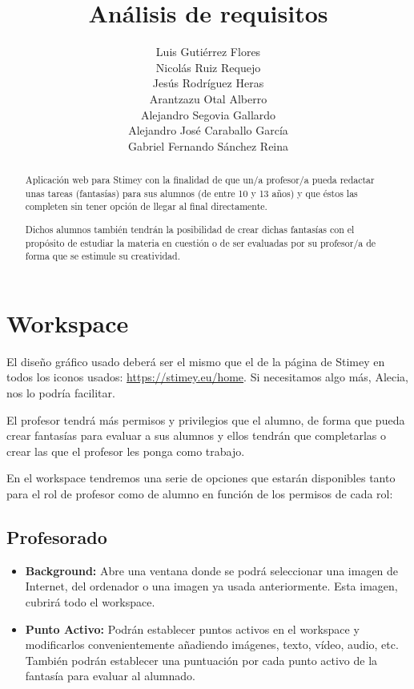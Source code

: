 \documentclass[12pt,letterpaper]{article}
\title{Análisis de requisitos}
\author{Luis Gutiérrez Flores\\
	Nicolás Ruiz Requejo\\
	Jesús Rodríguez Heras\\
	Arantzazu Otal Alberro\\
	Alejandro Segovia Gallardo\\
	Alejandro José Caraballo García\\
	Gabriel Fernando Sánchez Reina}
\begin{document}
	
	\maketitle
	\begin{abstract} %
			Aplicación web para Stimey con la finalidad de que un/a profesor/a pueda redactar unas tareas (fantasías) para sus alumnos (de entre 10 y 13 años) y que éstos las completen sin tener opción de llegar al final directamente.
			
			Dichos alumnos también tendrán la posibilidad de crear dichas fantasías con el propósito de estudiar la materia en cuestión o de ser evaluadas por su profesor/a de forma que se estimule su creatividad.
	\end{abstract}
	\thispagestyle{empty}
	\newpage
	
	
	
	
	
	\lstset{language=bash, numbers=left, numberstyle=\tiny, numbersep=10pt, firstnumber=1, stepnumber=1, basicstyle=\small\ttfamily, tabsize=1, extendedchars=true, inputencoding=utf8/latin1, breaklines=true}

\section{Workspace}
El diseño gráfico usado deberá ser el mismo que el de la página de Stimey en todos los iconos usados: \url{https://stimey.eu/home}. Si necesitamos algo más, Alecia, nos lo podría facilitar.

El profesor tendrá más permisos y privilegios que el alumno, de forma que pueda crear fantasías para evaluar a sus alumnos y ellos tendrán que completarlas o crear las que el profesor les ponga como trabajo.

En el workspace tendremos una serie de opciones que estarán disponibles tanto para el rol de profesor como de alumno en función de los permisos de cada rol:

\subsection{Profesorado}
\begin{itemize}
	\item \textbf{Background:} Abre una ventana donde se podrá seleccionar una imagen de Internet, del ordenador o una imagen ya usada anteriormente. Esta imagen, cubrirá todo el workspace.
	\item \textbf{Punto Activo:} Podrán establecer puntos activos en el workspace y modificarlos convenientemente añadiendo imágenes, texto, vídeo, audio, etc. También podrán establecer una puntuación por cada punto activo de la fantasía para evaluar al alumnado.
\end{itemize}
\end{document}
